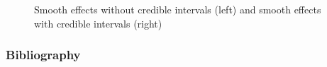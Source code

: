 \documentclass[xcolor=dvipsnames]{beamer}
\begin{document}
\begin{frame}
\begin{figure}[h!]
\begin{subfigure}[b]{0.4\linewidth}
  \end{subfigure}
  \caption{Smooth effects without credible intervals (left) and smooth effects with credible intervals (right)}
  \label{fig:directassessment}
\end{figure}
\end{frame}

\begin{frame}
\frametitle{Bibliography}
\printbibliography
\end{frame}
\end{document}

